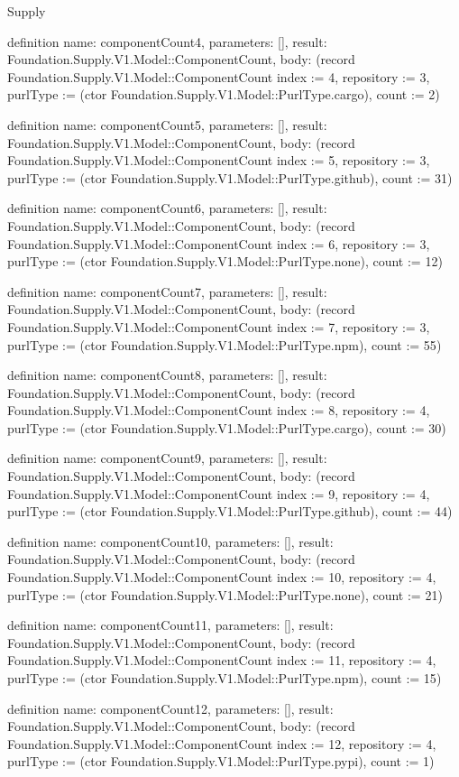 \begin{lexlean}{Supply}
\begin{semanticmodule}
definition{
  name: componentCount4,
  parameters: [],
  result: Foundation.Supply.V1.Model::ComponentCount,
  body: (record Foundation.Supply.V1.Model::ComponentCount {index := 4, repository := 3, purlType := (ctor Foundation.Supply.V1.Model::PurlType.cargo), count := 2})
}

definition{
  name: componentCount5,
  parameters: [],
  result: Foundation.Supply.V1.Model::ComponentCount,
  body: (record Foundation.Supply.V1.Model::ComponentCount {index := 5, repository := 3, purlType := (ctor Foundation.Supply.V1.Model::PurlType.github), count := 31})
}

definition{
  name: componentCount6,
  parameters: [],
  result: Foundation.Supply.V1.Model::ComponentCount,
  body: (record Foundation.Supply.V1.Model::ComponentCount {index := 6, repository := 3, purlType := (ctor Foundation.Supply.V1.Model::PurlType.none), count := 12})
}

definition{
  name: componentCount7,
  parameters: [],
  result: Foundation.Supply.V1.Model::ComponentCount,
  body: (record Foundation.Supply.V1.Model::ComponentCount {index := 7, repository := 3, purlType := (ctor Foundation.Supply.V1.Model::PurlType.npm), count := 55})
}

definition{
  name: componentCount8,
  parameters: [],
  result: Foundation.Supply.V1.Model::ComponentCount,
  body: (record Foundation.Supply.V1.Model::ComponentCount {index := 8, repository := 4, purlType := (ctor Foundation.Supply.V1.Model::PurlType.cargo), count := 30})
}

definition{
  name: componentCount9,
  parameters: [],
  result: Foundation.Supply.V1.Model::ComponentCount,
  body: (record Foundation.Supply.V1.Model::ComponentCount {index := 9, repository := 4, purlType := (ctor Foundation.Supply.V1.Model::PurlType.github), count := 44})
}

definition{
  name: componentCount10,
  parameters: [],
  result: Foundation.Supply.V1.Model::ComponentCount,
  body: (record Foundation.Supply.V1.Model::ComponentCount {index := 10, repository := 4, purlType := (ctor Foundation.Supply.V1.Model::PurlType.none), count := 21})
}

definition{
  name: componentCount11,
  parameters: [],
  result: Foundation.Supply.V1.Model::ComponentCount,
  body: (record Foundation.Supply.V1.Model::ComponentCount {index := 11, repository := 4, purlType := (ctor Foundation.Supply.V1.Model::PurlType.npm), count := 15})
}

definition{
  name: componentCount12,
  parameters: [],
  result: Foundation.Supply.V1.Model::ComponentCount,
  body: (record Foundation.Supply.V1.Model::ComponentCount {index := 12, repository := 4, purlType := (ctor Foundation.Supply.V1.Model::PurlType.pypi), count := 1})
}


\end{semanticmodule}
\end{lexlean}
